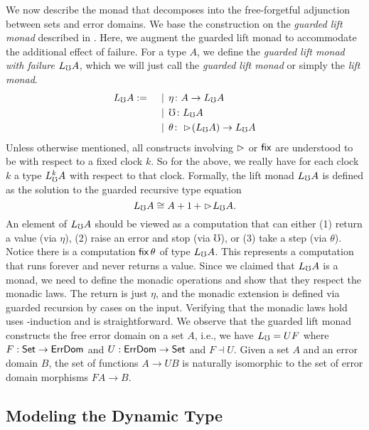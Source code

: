 We now describe the monad that decomposes into the free-forgetful adjunction
between sets and error domains. We base the construction on the \emph{guarded
lift monad} described in \cite{mogelberg-paviotti2016}. Here, we augment the
guarded lift monad to accommodate the additional effect of failure. For a type
$A$, we define the \emph{guarded lift monad with failure} $L_\mho A$, which we will
just call the \emph{guarded lift monad} or simply the \emph{lift monad}.
%
\begin{align*}
  L_\mho A :=\quad
  &\mathrel{\bf \,\mid\,} \eta \colon A \to L_\mho A \\
  &\mathrel{\bf \,\mid\,} \mho \colon L_\mho A \\
  &\mathrel{\bf \,\mid\,} \theta \colon \vartriangleright \hspace{-0.2em} (L_\mho A) \to L_\mho A
\end{align*}
%
Unless otherwise mentioned, all constructs involving $\vartriangleright$ or $\mathsf{fix}$ are
understood to be with respect to a fixed clock $k$. So for the above, we really
have for each clock $k$ a type $L_\mho^k A$ with respect to that clock.
%
Formally, the lift monad $L_\mho A$ is defined as the solution to the guarded
recursive type equation
%
\[ L_\mho A \cong A + 1\, + \vartriangleright \hspace{-0.2em} L_\mho A. \]
%
An element of $L_\mho A$ should be viewed as a computation that can either (1)
return a value (via $\eta$), (2) raise an error and stop (via $\mho$), or (3)
take a step (via $\theta$).
%
Notice there is a computation $\mathsf{fix}\, \theta$ of type $L_\mho A$. This represents a
computation that runs forever and never returns a value.
%
Since we claimed that $L_\mho A$ is a monad, we need to define the monadic
operations and show that they respect the monadic laws. The return is just
$\eta$, and the monadic extension is defined via guarded recursion by cases on
the input.
%
%
Verifying that the monadic laws hold uses \lob-induction and is straightforward.
%
We observe that the guarded lift monad constructs the free error domain on a set
$A$, i.e., we have $L_\mho = UF$ where $F : \mathsf{Set} \to \textsf{ErrDom}$ and $U : \textsf{ErrDom} \to
\mathsf{Set}$ and $F \dashv U$. Given a set $A$ and an error domain $B$, the set of
functions $A \to UB$ is naturally isomorphic to the set of error domain
morphisms $FA \to B$.



\subsection{Modeling the Dynamic Type}\label{sec:dynamic-type}

